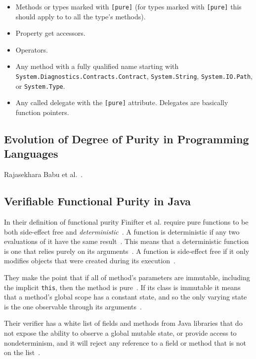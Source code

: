 \documentclass[a4paper,12pt]{article}
\begin{document}
\begin{itemize}
  \item Methods or types marked with \texttt{[pure]} (for types marked with \texttt{[pure]} this should apply to to all the type's methods).
  \item Property get accessors.
  \item Operators.
  \item Any method with a fully qualified name starting with \texttt{System.Diagnost\-ics.Contracts.Contract}, \texttt{System.String}, \texttt{System\-.IO.Path}, or \texttt{System.Type}.
  \item Any called delegate with the \texttt{[pure]} attribute. Delegates are basically function pointers.
\end{itemize}

\subsection{Evolution of Degree of Purity in Programming Languages} \label{sub:Evolution of Degree of Purity in Programming Languages}
Rajasekhara Babu et al.~\cite{rajasekharababu2012evolution}.

\subsection{Verifiable Functional Purity in Java} \label{sub:Verifiable-Functional-Purity-in-Java}
In their definition of functional purity Finifter et al. require pure functions to be both side-effect free and \textit{deterministic}~\cite{purity-in-java}. A function is deterministic if any two evaluations of it have the same result~\cite{purity-in-java}. This means that a deterministic function is one that relies purely on its arguments~\cite{purity-in-java}. A function is side-effect free if it only modifies objects that were created during its execution~\cite{purity-in-java}.

They make the point that if all of method's parameters are immutable, including the implicit \texttt{this}, then the method is pure~\cite{purity-in-java}. %
If its class is immutable it means that a method's global scope has a constant state, and so the only varying state is the one observable through its arguments~\cite{purity-in-java}.

Their verifier has a white list of fields and methods from Java libraries that do not expose the ability to observe a global mutable state, or provide access to nondeterminism, and it will reject any reference to a field or method that is not on the list~\cite{purity-in-java}.
\end{document}
